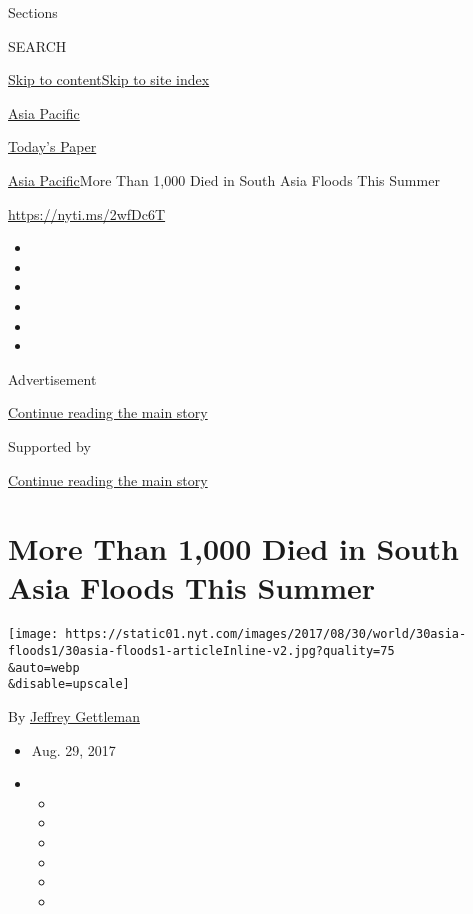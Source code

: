 Sections

SEARCH

\protect\hyperlink{site-content}{Skip to
content}\protect\hyperlink{site-index}{Skip to site index}

\href{https://www.nytimes.com/section/world/asia}{Asia Pacific}

\href{https://myaccount.nytimes.com/auth/login?response_type=cookie\&client_id=vi}{}

\href{https://www.nytimes.com/section/todayspaper}{Today's Paper}

\href{/section/world/asia}{Asia Pacific}\textbar{}More Than 1,000 Died
in South Asia Floods This Summer

\url{https://nyti.ms/2wfDc6T}

\begin{itemize}
\item
\item
\item
\item
\item
\item
\end{itemize}

Advertisement

\protect\hyperlink{after-top}{Continue reading the main story}

Supported by

\protect\hyperlink{after-sponsor}{Continue reading the main story}

\hypertarget{more-than-1000-died-in-south-asia-floods-this-summer}{%
\section{More Than 1,000 Died in South Asia Floods This
Summer}\label{more-than-1000-died-in-south-asia-floods-this-summer}}

\texttt{[image: https://static01.nyt.com/images/2017/08/30/world/30asia-floods1/30asia-floods1-articleInline-v2.jpg?quality=75\\\&auto=webp\\\&disable=upscale]}

By \href{https://www.nytimes.com/by/jeffrey-gettleman}{Jeffrey
Gettleman}

\begin{itemize}
\item
  Aug. 29, 2017
\item
  \begin{itemize}
  \item
  \item
  \item
  \item
  \item
  \item
  \end{itemize}
\end{itemize}

